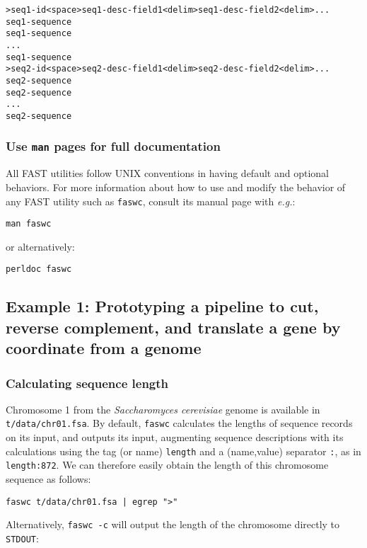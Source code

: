 \documentclass[11pt]{article}
\begin{document}
\begin{verbatim}
>seq1-id<space>seq1-desc-field1<delim>seq1-desc-field2<delim>...
seq1-sequence
seq1-sequence
...
seq1-sequence
>seq2-id<space>seq2-desc-field1<delim>seq2-desc-field2<delim>...
seq2-sequence
seq2-sequence
...
seq2-sequence
\end{verbatim}
\subsubsection{Use \texttt{man} pages for full documentation}
\label{sec-2_1_2}


All FAST utilities follow UNIX conventions in having default and
optional behaviors. For more information about how to use and modify
the behavior of any FAST utility such as \texttt{faswc}, consult its manual
page with \emph{e.g.}:

\begin{verbatim}
man faswc
\end{verbatim}

or alternatively:

\begin{verbatim}
perldoc faswc
\end{verbatim}
\subsection{Example 1: Prototyping a pipeline to cut, reverse complement, and translate a gene by coordinate from a genome}
\label{sec-2_2}
\subsubsection{Calculating sequence length}
\label{sec-2_2_1}


Chromosome 1 from the \emph{Saccharomyces cerevisiae} genome is available
in \texttt{t/data/chr01.fsa}. By default, \texttt{faswc} calculates the lengths of
sequence records on its input, and outputs its input, augmenting
sequence descriptions with its calculations using the tag (or name)
\texttt{length} and a (name,value) separator \texttt{:}, as in \texttt{length:872}. We can
therefore easily obtain the length of this chromosome sequence as
follows:

\begin{verbatim}
faswc t/data/chr01.fsa | egrep ">"
\end{verbatim}

Alternatively, \texttt{faswc -c} will output the length of the chromosome
directly to \texttt{STDOUT}:
\end{document}
